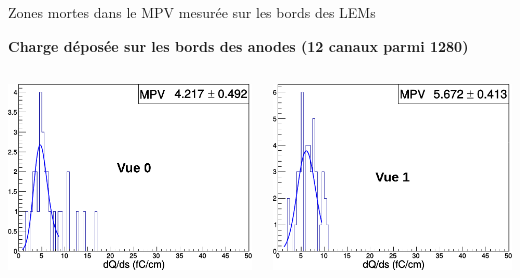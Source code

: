     \begin{frame}{Zones mortes dans le \TOO{}}{MPV mesurée sur les bords des LEMs}
        \begin{scriptsize}
            \centering \textbf{Charge déposée sur les bords des anodes (12 canaux parmi 1280)}
            \begin{columns}
                \begin{column}{0.5\textwidth}
                    \includegraphics[width=\textwidth]{./pictures/dQds_840_0_border.pdf}
                \end{column}
                \begin{column}{0.5\textwidth}
                    \includegraphics[width=\textwidth]{./pictures/dQds_840_1_border.pdf}

\end{column}
\end{columns}
\end{scriptsize}
\end{frame}
